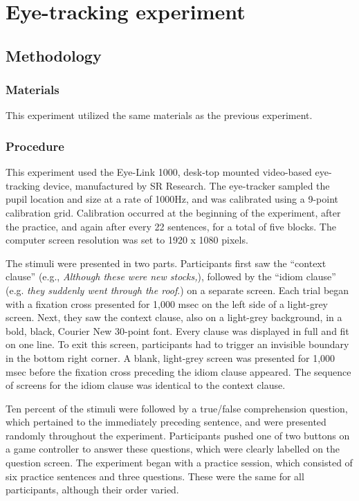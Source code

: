 \documentclass[output=paper
,modfonts
,nonflat]{langsci/langscibook}
\begin{document}



\section{Eye-tracking experiment}
\subsection{Methodology}

\subsubsection{Materials}
This experiment utilized the same materials as the previous experiment.


\subsubsection{Procedure}

This experiment used the Eye-Link 1000, desk-top mounted video-based eye-tracking device, manufactured by SR Research. The eye-tracker sampled the pupil location and size at a rate of 1000Hz, and was calibrated using a 9-point calibration grid. Calibration occurred at the beginning of the experiment, after the practice, and again after every 22 sentences, for a total of five blocks. The computer screen resolution was set to 1920 x 1080 pixels.

The stimuli were presented in two parts. Participants first saw the ``context clause'' (e.g., \textit{ Although these were new stocks,}), followed by the ``idiom clause'' (e.g. \textit{they suddenly went through the roof}.) on a separate screen. Each trial began with a fixation cross presented for 1,000 msec on the left side of a light-grey screen. Next, they saw the context clause, also on a light-grey background, in a bold, black, Courier New 30-point font. Every clause was displayed in full and fit on one line. To exit this screen, participants had to trigger an invisible boundary in the bottom right corner. A blank, light-grey screen was presented for 1,000 msec before the fixation cross preceding the idiom clause appeared. The sequence of screens for the idiom clause was identical to the context clause. 

Ten percent of the stimuli were followed by a true/false comprehension question, which pertained to the immediately preceding sentence, and were presented randomly throughout the experiment. Participants pushed one of two buttons on a game controller to answer these questions, which were clearly labelled on the question screen. The experiment began with a practice session, which consisted of six practice sentences and three questions. These were the same for all participants, although their order varied. 
\end{document}
